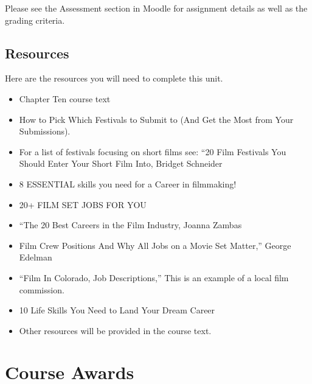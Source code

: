 \documentclass[
  letterpaper,
  DIV=11,
  numbers=noendperiod]{scrreprt}
\providecommand{\tightlist}{%
  \setlength{\itemsep}{0pt}\setlength{\parskip}{0pt}}\usepackage{longtable,booktabs,array}
\begin{document}
\begin{tcolorbox}[enhanced jigsaw, toprule=.15mm, colframe=quarto-callout-note-color-frame, colback=white, arc=.35mm, left=2mm, rightrule=.15mm, bottomrule=.15mm, opacityback=0, breakable, leftrule=.75mm]
\begin{minipage}[t]{5.5mm}
\textcolor{quarto-callout-note-color}{\faInfo}
\end{minipage}%
\begin{minipage}[t]{\textwidth - 5.5mm}

Please see the Assessment section in Moodle for assignment details as
well as the grading criteria.

\end{minipage}%
\end{tcolorbox}

\subsection*{Resources}\label{resources-9}

Here are the resources you will need to complete this unit.

\begin{itemize}
\tightlist
\item
  Chapter Ten course text
\item
  How to Pick Which Festivals to Submit to (And Get the Most from Your
  Submissions).
\item
  For a list of festivals focusing on short films see: ``20 Film
  Festivals You Should Enter Your Short Film Into, Bridget Schneider
\item
  8 ESSENTIAL skills you need for a Career in filmmaking!
\item
  20+ FILM SET JOBS FOR YOU
\item
  ``The 20 Best Careers in the Film Industry, Joanna Zambas
\item
  Film Crew Positions And Why All Jobs on a Movie Set Matter,'' George
  Edelman
\item
  ``Film In Colorado, Job Descriptions,'' This is an example of a local
  film commission.
\item
  10 Life Skills You Need to Land Your Dream Career
\item
  Other resources will be provided in the course text.
\end{itemize}

\section{Course Awards}\label{course-awards}
\end{document}

